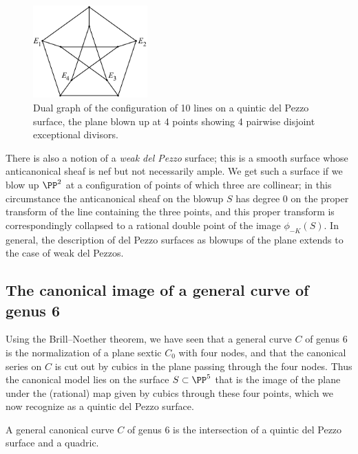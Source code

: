 \begin{figure}
\centerline {\includegraphics[height=1.4in]{main/Fig11-5}}
\caption{Dual graph of the configuration of 10 lines on a quintic del
Pezzo surface, the plane blown up
at 4 points showing 4 pairwise disjoint exceptional divisors.}
\label{dual graph of the configuration of 10 lines on a quintic del
Pezzo surface}
\end{figure}

There is also a notion of a \emph{weak del Pezzo}
%
surface; this is a
smooth surface whose
anticanonical sheaf
%
 is
nef but not necessarily ample.
%
We get such a surface if we blow up $\PP^2$ at a configuration
of points of which three are collinear; in this circumstance the
anticanonical sheaf on the blowup $S$ has degree 0 on the proper
transform of the line containing the three points, and this proper
transform is correspondingly collapsed to a rational double point of the
image $\phi_{-K}(S)$. In general, the description of del Pezzo surfaces
as blowups of the plane extends to the case of weak del Pezzos.



\subsection{The canonical image of a general curve of genus 6}

Using the Brill--Noether theorem, we have seen that a general curve $C$
of genus 6 is the normalization of a plane sextic $C_0$ with four nodes,
and that the canonical series on $C$ is cut out by cubics in the plane
passing through the four nodes. Thus the canonical model lies on the
surface $S \subset \PP^5$ that is the image of the plane under the
(rational) map given by cubics through these four points, which we now
recognize as a quintic del Pezzo surface.

\begin{theorem}
A general canonical curve $C$ of genus 6 is the intersection of a quintic
del Pezzo surface and a quadric.
\end{theorem}

